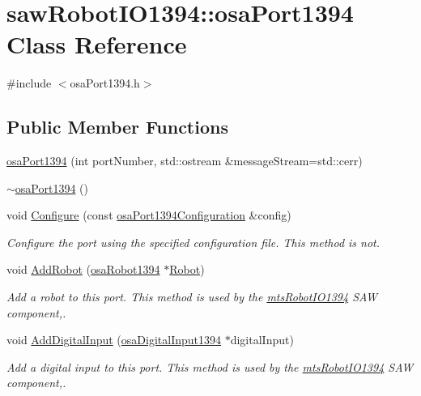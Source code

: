 \hypertarget{classsaw_robot_i_o1394_1_1osa_port1394}{\section{saw\-Robot\-I\-O1394\-:\-:osa\-Port1394 Class Reference}
\label{classsaw_robot_i_o1394_1_1osa_port1394}
}


{\ttfamily \#include $<$osa\-Port1394.\-h$>$}

\subsection*{Public Member Functions}
\begin{DoxyCompactItemize}
\item 
\hyperlink{classsaw_robot_i_o1394_1_1osa_port1394_a41274223831e4ba37ce3adf64994dd53}{osa\-Port1394} (int port\-Number, std\-::ostream \&message\-Stream=std\-::cerr)
\item 
\hyperlink{classsaw_robot_i_o1394_1_1osa_port1394_a47707c30b344f6a37b83c2d5fe01a22c}{$\sim$osa\-Port1394} ()
\item 
void \hyperlink{classsaw_robot_i_o1394_1_1osa_port1394_af26490a8bda08a0af924edd6ae6849a2}{Configure} (const \hyperlink{structsaw_robot_i_o1394_1_1osa_port1394_configuration}{osa\-Port1394\-Configuration} \&config)
\begin{DoxyCompactList}\small\item\em Configure the port using the specified configuration file. This method is not. \end{DoxyCompactList}\item 
void \hyperlink{classsaw_robot_i_o1394_1_1osa_port1394_a66c47cf88533156dad37561fa2956fd8}{Add\-Robot} (\hyperlink{classsaw_robot_i_o1394_1_1osa_robot1394}{osa\-Robot1394} $\ast$\hyperlink{classsaw_robot_i_o1394_1_1osa_port1394_af2f6610aeec705984041bcc435bc5dda}{Robot})
\begin{DoxyCompactList}\small\item\em Add a robot to this port. This method is used by the \hyperlink{classmts_robot_i_o1394}{mts\-Robot\-I\-O1394} S\-A\-W component,. \end{DoxyCompactList}\item 
void \hyperlink{classsaw_robot_i_o1394_1_1osa_port1394_ae3e0f7083835470bd8989624757514b2}{Add\-Digital\-Input} (\hyperlink{classsaw_robot_i_o1394_1_1osa_digital_input1394}{osa\-Digital\-Input1394} $\ast$digital\-Input)
\begin{DoxyCompactList}\small\item\em Add a digital input to this port. This method is used by the \hyperlink{classmts_robot_i_o1394}{mts\-Robot\-I\-O1394} S\-A\-W component,. \end{DoxyCompactList}\item 

\end{DoxyCompactItemize}
